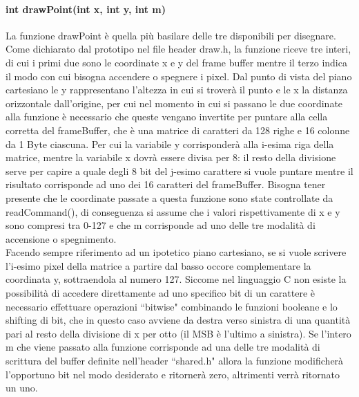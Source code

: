 \documentclass{article}
\begin{document}
		\paragraph{int drawPoint(int x, int y, int m)} La funzione drawPoint è quella più basilare delle tre disponibili per disegnare. Come dichiarato dal prototipo nel file header draw.h, la funzione riceve tre interi, di cui i primi due sono le coordinate x e y del frame buffer mentre il terzo indica il modo con cui bisogna accendere o spegnere i pixel. Dal punto di vista del piano cartesiano le y rappresentano l'altezza in cui si troverà il punto e le x la distanza orizzontale dall'origine, per cui nel momento in cui si passano le due coordinate alla funzione è necessario che queste vengano invertite per puntare alla cella corretta del frameBuffer, che è una matrice di caratteri da 128 righe e 16 colonne da 1 Byte ciascuna. Per cui la variabile y corrisponderà alla i-esima riga della matrice, mentre la variabile x dovrà essere divisa per 8: il resto della divisione serve per capire a quale degli 8 bit del j-esimo carattere si vuole puntare mentre il risultato corrisponde ad uno dei 16 caratteri del frameBuffer. Bisogna tener presente che le coordinate passate a questa funzione sono state controllate da readCommand(), di conseguenza si assume che i valori rispettivamente di x e y sono compresi tra 0-127 e che m corrisponde ad uno delle tre modalità di accensione o spegnimento.\\
		Facendo sempre riferimento ad un ipotetico piano cartesiano, se si vuole scrivere l'i-esimo pixel della matrice a partire dal basso occore complementare la coordinata y, sottraendola al numero 127. Siccome nel linguaggio C non esiste la possibilità di accedere direttamente ad uno specifico bit di un carattere è necessario effettuare operazioni ``bitwise" combinando le funzioni booleane e lo shifting di bit, che in questo caso avviene da destra verso sinistra di una quantità pari al resto della divisione di x per otto (il MSB è l'ultimo a sinistra).
		\newline
		Se l'intero m che viene passato alla funzione corrisponde ad una delle tre modalità di scrittura del buffer definite nell'header ``shared.h" allora la funzione modificherà l'opportuno bit nel modo desiderato e ritornerà zero, altrimenti verrà ritornato un uno.
\end{document}
